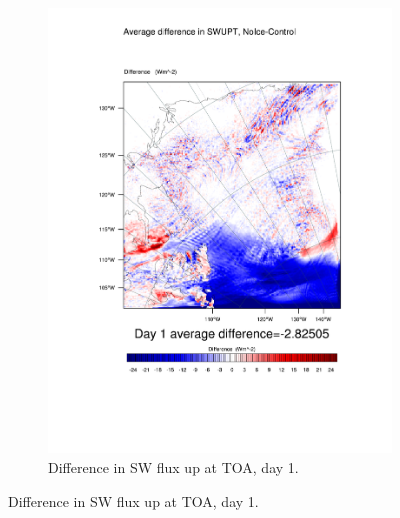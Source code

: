 \begin{figure}
\begin{subfigure}{0.48\textwidth}
		\includegraphics[width=\textwidth]{results/noice/diff_NoIce_SWUPT_Day1.pdf}
		\caption{Difference in SW flux up at TOA, day 1.}
		\label{subfig:swup_r2Day1}
	\end{subfigure}
	

\end{figure}
